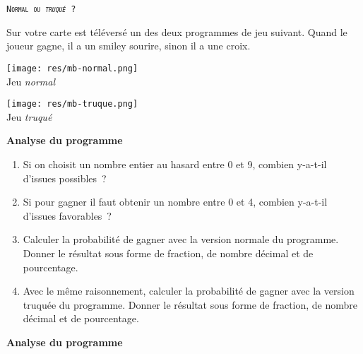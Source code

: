\begin{eleve}    
    \texttt{\textsc{Normal ou \emph{truqué} ?}}
    
    Sur votre carte est téléversé un des deux programmes de jeu suivant. Quand le joueur gagne, il a un smiley sourire, sinon il a  une croix. 
    
    
    
\begin{minipage}[t]{0.5\linewidth}
    \begin{center}
        \vspace{0cm}
        \texttt{[image: res/mb-normal.png]}\\
        Jeu \emph{normal}
    \end{center}
\end{minipage}
\hfill
\begin{minipage}[t]{0.5\linewidth}
    \begin{center}
        \vspace{0cm}
        \texttt{[image: res/mb-truque.png]}\\
        Jeu \emph{truqué}
    \end{center}
\end{minipage}
    
    \textbf{Analyse du programme}
    
    \begin{enumerate}
        \item   Si on choisit un nombre entier au hasard entre 0 et 9, combien y-a-t-il d’issues possibles ?
        \item Si pour gagner il faut obtenir un nombre entre 0 et 4, combien y-a-t-il d’issues favorables ?  
        \item Calculer la probabilité de gagner avec la version normale du programme. Donner le résultat sous forme de fraction, de nombre décimal et de pourcentage.
        \item Avec le même raisonnement, calculer la probabilité de gagner avec la version truquée du programme. Donner le résultat sous forme de fraction, de nombre décimal et de pourcentage.
    \end{enumerate}
    
    \newpage
    \textbf{Analyse du programme}
    

\end{eleve}

